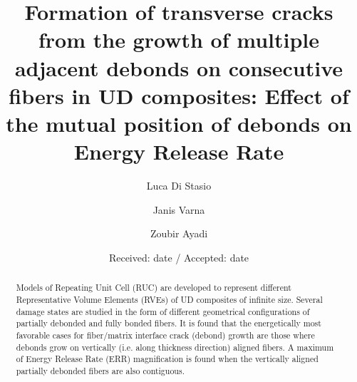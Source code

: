 \documentclass[smallextended]{svjour3}       %
\begin{document}
\title{Formation of transverse cracks from the growth of multiple adjacent debonds on consecutive fibers in UD composites: Effect of the mutual position of debonds on Energy Release Rate
}


\author{Luca Di Stasio   \and
        Janis Varna \and
        Zoubir Ayadi
}



\date{Received: date / Accepted: date}


\maketitle

\begin{abstract}
Models of Repeating Unit Cell (RUC) are developed to represent different Representative Volume Elements (RVEs) of UD composites of infinite size. Several damage states are studied in the form of different geometrical configurations of partially debonded and fully bonded fibers. It is found that the energetically most favorable cases for fiber/matrix interface crack (debond) growth are those where debonds grow on vertically (i.e. along thickness direction) aligned fibers. A maximum of Energy Release Rate (ERR) magnification is found when the vertically aligned partially debonded fibers are also contiguous. 
\end{abstract}
\end{document}
